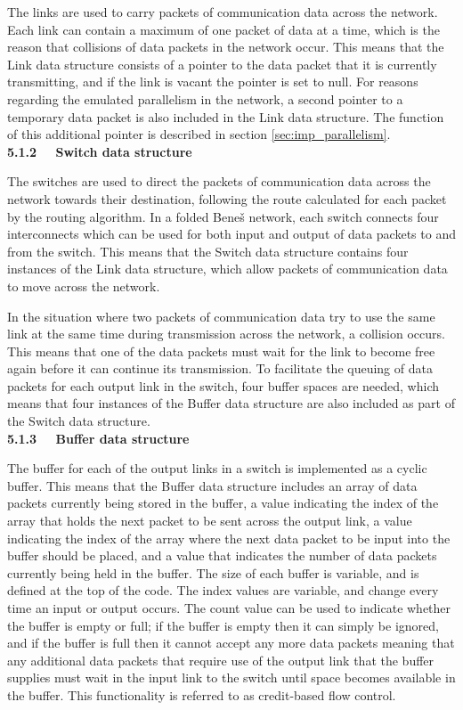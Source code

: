 \documentclass[a4paper, 12pt]{article}
\begin{document}
\noindent The links are used to carry packets of communication data across the network. Each link can contain a maximum of one packet of data at a time, which is the reason that collisions of data packets in the network occur. This means that the Link data structure consists of a pointer to the data packet that it is currently transmitting, and if the link is vacant the pointer is set to null. For reasons regarding the emulated parallelism in the network, a second pointer to a temporary data packet is also included in the Link data structure. The function of this additional pointer is described in section \ref{sec:imp_parallelism}.\\

\noindent\textbf{5.1.2 \ \ Switch data structure}

\noindent The switches are used to direct the packets of communication data across the network towards their destination, following the route calculated for each packet by the routing algorithm. In a folded Bene\v{s} network, each switch connects four interconnects which can be used for both input and output of data packets to and from the switch. This means that the Switch data structure contains four instances of the Link data structure, which allow packets of communication data to move across the network. 

In the situation where two packets of communication data try to use the same link at the same time during transmission across the network, a collision occurs. This means that one of the data packets must wait for the link to become free again before it can continue its transmission. To facilitate the queuing of data packets for each output link in the switch, four buffer spaces are needed, which means that four instances of the Buffer data structure are also included as part of the Switch data structure.\\

\noindent\textbf{5.1.3 \ \ Buffer data structure}

\noindent The buffer for each of the output links in a switch is implemented as a cyclic buffer. This means that the Buffer data structure includes an array of data packets currently being stored in the buffer, a value indicating the index of the array that holds the next packet to be sent across the output link, a value indicating the index of the array where the next data packet to be input into the buffer should be placed, and a value that indicates the number of data packets currently being held in the buffer. The size of each buffer is variable, and is defined at the top of the code. The index values are variable, and change every time an input or output occurs. The count value can be used to indicate whether the buffer is empty or full; if the buffer is empty then it can simply be ignored, and if the buffer is full then it cannot accept any more data packets meaning that any additional data packets that require use of the output link that the buffer supplies must wait in the input link to the switch until space becomes available in the buffer. This functionality is referred to as credit-based flow control.\\
\end{document}
